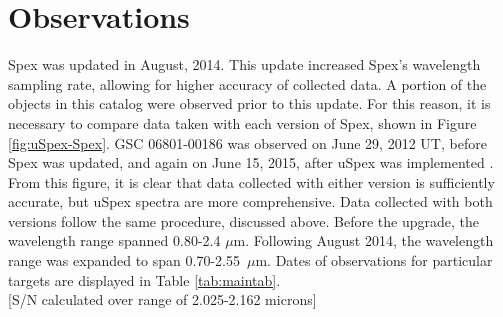 \section{Observations}





Spex was updated in August, 2014.  This update increased Spex's wavelength sampling rate, allowing for higher accuracy of collected data.  
A portion of the objects in this catalog were observed prior to this update.  For this reason, it is necessary to compare data taken with each version of Spex, shown in Figure \ref{fig:uSpex-Spex}.  
GSC 06801-00186 was observed on June 29, 2012 UT, before Spex was updated, and again on June 15, 2015, after uSpex was implemented \cite{Spextool_Manual_Cushing_2015}.  From this figure, it is clear that data collected with either version is sufficiently accurate, but uSpex spectra are more comprehensive.  Data collected with both versions follow the same procedure, discussed above.  Before the upgrade, the wavelength range spanned 0.80-2.4 $\mu$m.  Following August 2014, the wavelength range was expanded to span 0.70-2.55~$\mu$m.  Dates of observations for particular targets are displayed in Table \ref{tab:maintab}. \\



[S/N calculated over range of 2.025-2.162 microns]


